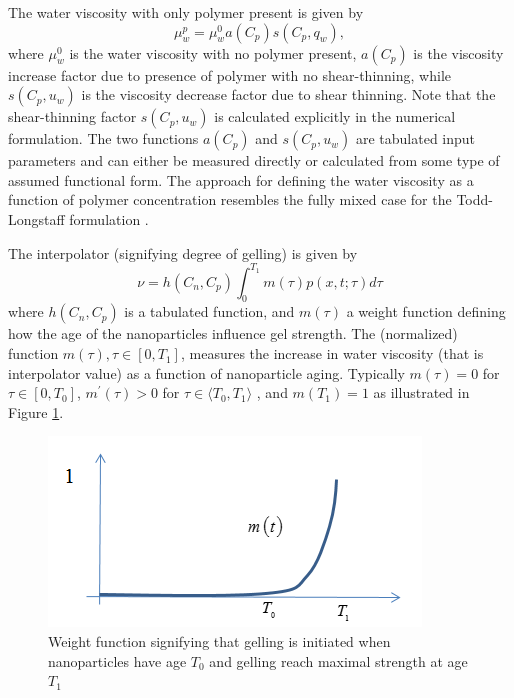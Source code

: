 \documentclass[journal = enfuem, manuscript =  article]{achemso}
\begin{document}
The water viscosity with only polymer present is given by
\begin{equation}
    \mu_w^p=\mu_w^0 a(C_p) s(C_p, q_w),
\end{equation}
where $\mu_w^0$ is the water viscosity with no polymer present, $a (C_p)$ is the viscosity increase factor due to presence of polymer with no shear-thinning, while $s(C_p, u_w)$ is the viscosity decrease factor due to shear thinning. Note that the shear-thinning factor $s(C_p, u_w)$ is calculated explicitly in the numerical formulation. The two functions $a (C_p)$ and $s(C_p, u_w)$ are tabulated input parameters and can either be measured directly or calculated from some type of assumed functional form. The approach for defining the water viscosity as a function of polymer concentration resembles the fully mixed case for the Todd-Longstaff formulation \citep{slb2015}.   

The interpolator (signifying degree of gelling) is given by
\begin{equation} \label{eq:ageEffect} %
    \nu=h(C_n,C_p) \int^{T_1}_{0}m(\tau)p(x,t;\tau)d\tau
\end{equation}
where $h(C_n,C_p)$ is a tabulated function, and $m(\tau)$ a weight function defining how the age of the nanoparticles influence gel strength. The (normalized) function $m(\tau), \tau\in[0,T_1]$, measures the increase in water viscosity (that is interpolator value) as a function of nanoparticle aging. Typically $m(\tau)=0$ for $\tau\in[0,T_0]$,  $m^\prime(\tau)>0$ for $\tau\in\langle T_0, T_1\rangle$ , and $m(T_1)=1$ as illustrated in Figure \ref{fig:weightFunc}.

\begin{figure}[h]
    \centering
    \includegraphics[width=.85\textwidth]{fig/weightFunc.png}
    \caption{Weight function signifying that gelling is initiated when nanoparticles have age $T_0$ and gelling reach maximal strength at age $T_1$}
    \label{fig:weightFunc}
\end{figure}
\end{document}
